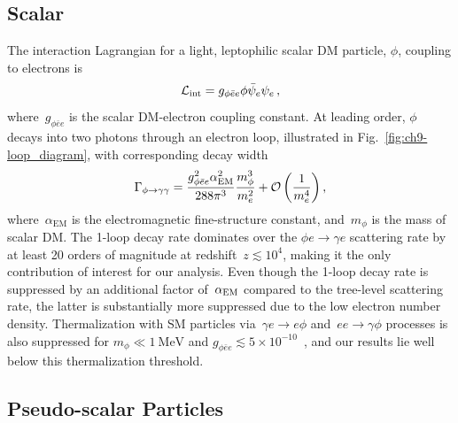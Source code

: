 \subsection{Scalar}
The interaction Lagrangian for a light, leptophilic scalar DM particle, $\phi$, coupling to electrons is
\begin{equation}
  \mathcal{L}_{\rm{int}} =  g_{\phi \bar e e} \phi \bar\psi_e \psi_e\,,
  \label{eq:ch9-Lint_scalar}
\end{equation}
where~$g_{\phi \bar{e} e}$ is the scalar DM-electron coupling constant.
At leading order, $\phi$ decays into two photons through an electron loop, illustrated in Fig.~\ref{fig:ch9-loop_diagram}, with corresponding decay width
\begin{equation}
  \Gamma_{\phi \rightarrow \gamma \gamma} = \frac{g_{\phi \bar e e}^2 \alpha_{\rm{EM}}^2}{288 \pi^3} \frac{m_\phi^3}{m_e^2} + \mathcal{O}\left(\frac{1}{m_e^4}\right),
  \label{eq:ch9-Gamma_scalar}
\end{equation}
where~$\alpha_\mathrm{EM}$ is the electromagnetic fine-structure constant, and~$m_\phi$ is the mass of scalar DM.
The 1-loop decay rate dominates over the $\phi e \rightarrow \gamma e$ scattering rate by at least 20 orders of magnitude at redshift~$z \lesssim 10^4$, making it the only contribution of interest for our analysis.
Even though the 1-loop decay rate is suppressed by an additional factor of~$\alpha_{\rm{EM}}$ compared to the tree-level scattering rate, the latter is substantially more suppressed due to the low electron number density.
Thermalization with SM particles via~$\gamma e \rightarrow e \phi$ and~$ee \rightarrow \gamma \phi$ processes is also suppressed for $m_\phi \ll 1~\text{MeV}$ and $g_{\phi \bar e e} \lesssim 5 \times 10^{-10}$~\cite{Knapen:2017xzo}, and our results lie well below this thermalization threshold.



\subsection{Pseudo-scalar Particles}

